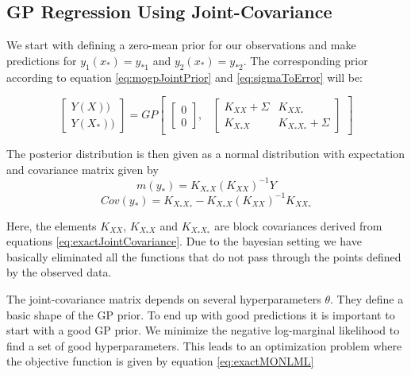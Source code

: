 \subsection{GP Regression Using Joint-Covariance }\label{sub:GPUsingJointKernel}


We start with defining a zero-mean prior for our observations and make predictions for \(y_{1}\left ( x_{*} \right ) = y_{*1}\) and \(y_{2}\left ( x_{*} \right ) = y_{*2}\). The corresponding prior according to equation \ref{eq:mogpJointPrior} and \ref{eq:sigmaToError} will be:
 
 \begin{equation}\label{eq:MOGPPrior}
 \begin{bmatrix}
   Y(X))\\ 
   Y(X_{*}))
   \end{bmatrix} = GP\begin{bmatrix}
   \begin{bmatrix}
   0\\ 
   0
   \end{bmatrix}, 
   & 
   \begin{bmatrix}
   K_{XX} + \Sigma & K_{XX_{*}}\\ 
   K_{X_{*}X} & K_{X_{*}X_{*}} + \Sigma
   \end{bmatrix} 

   \end{bmatrix} 
 \end{equation}

  
  The posterior distribution is then given as a normal distribution with expectation and covariance matrix given by \cite{Rasmussen2005}
  \begin{equation}\label{eq:predictiveMOMean}
  m(y_{*}) = K_{X_{*}X}\left ( K_{XX} \right )^{-1}Y
  \end{equation}
  \begin{equation}\label{eq:predictiveMOCovariance}
  Cov(y_{*}) = K_{X_{*}X_{*}} - K_{X_{*}X}\left ( K_{XX} \right )^{-1}K_{XX_{*}}
  \end{equation}
  
  Here, the elements \(K_{XX}\), \(K_{X_{*}X}\) and \(K_{X_{*}X_{*}}\) are block covariances derived from equations \ref{eq:exactJointCovariance}. Due to the bayesian setting we have basically eliminated all the functions that do not pass through the points defined by the observed data.
  
  The joint-covariance matrix depends on several hyperparameters \(\theta\). They define a basic shape of the GP prior. To end up with good predictions it is important to start with a good GP prior. We minimize the negative log-marginal likelihood to find a set of good hyperparameters. This leads to an optimization problem where the objective function is given by equation \ref{eq:exactMONLML} 
  
